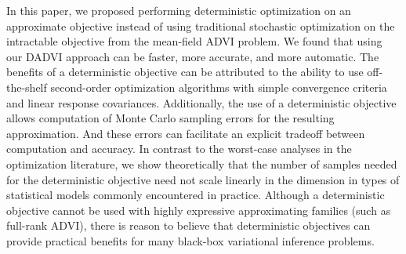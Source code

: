 In this paper, we proposed performing deterministic optimization on an approximate objective
instead of using traditional stochastic optimization 
on the intractable objective from the mean-field ADVI problem.
We found that using our DADVI approach can be faster, more accurate, and more automatic.
The benefits
of a deterministic objective can be attributed to the ability to use
off-the-shelf second-order optimization algorithms with simple convergence
criteria and linear response covariances.  Additionally, the use of a
deterministic objective allows computation of Monte Carlo sampling errors for
the resulting approximation. And these errors can facilitate an explicit tradeoff between computation
and accuracy.  In contrast to the worst-case analyses in the optimization
literature, we show theoretically that the number of samples needed for the
deterministic objective need not scale linearly in the dimension in types of
statistical models commonly encountered in practice.  Although a deterministic
objective cannot be used with highly expressive approximating families (such as
full-rank ADVI), there is reason to believe that deterministic objectives can
provide practical benefits for many black-box variational inference problems.
